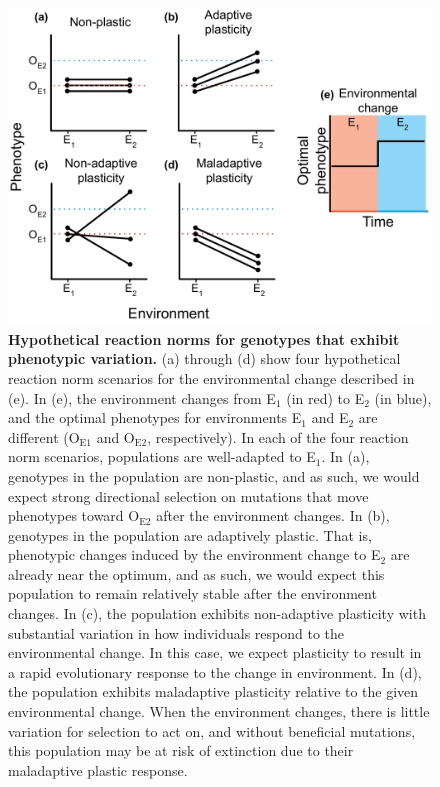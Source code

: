 \begin{figure}[ht!]
    \centering
    \includegraphics[width=\textwidth]{chapters/03-evolutionary-consequences-of-plasticity/media/reaction-norms.pdf}
    \caption{\small
    \textbf{Hypothetical reaction norms for genotypes that exhibit phenotypic variation.}
    (a) through (d) show four hypothetical reaction norm scenarios for the environmental change described in (e).  
    In (e), the environment changes from E$_1$ (in red) to E$_2$ (in blue), and the optimal phenotypes for environments E$_1$ and E$_2$ are different (O$_{\text{E}1}$ and O$_{\text{E}2}$, respectively).
    In each of the four reaction norm scenarios, populations are well-adapted to E$_1$.
    In (a), genotypes in the population are non-plastic, and as such, we would expect strong directional selection on mutations that move phenotypes toward O$_{\text{E}2}$ after the environment changes.
    In (b), genotypes in the population are adaptively plastic. 
    That is, phenotypic changes induced by the environment change to E$_2$ are already near the optimum, and as such, we would expect this population to remain relatively stable after the environment changes.
    In (c), the population exhibits non-adaptive plasticity with substantial variation in how individuals respond to the environmental change. 
    In this case, we expect plasticity to result in a rapid evolutionary response to the change in environment.  
    In (d), the population exhibits maladaptive plasticity relative to the given environmental change. 
    When the environment changes, there is little variation for selection to act on, and without beneficial mutations, this population may be at risk of extinction due to their maladaptive plastic response.
    }
    \label{chapter:consequences-of-plasticity:fig:reaction-norms}
\end{figure}